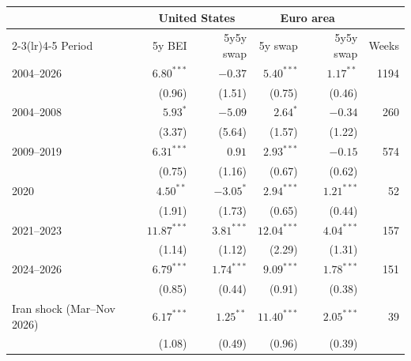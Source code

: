 \begin{tabular}{lrrrrr}
\toprule
 & \multicolumn{2}{c}{United States} & \multicolumn{2}{c}{Euro area} & \\ \cmidrule(lr){2-3}\cmidrule(lr){4-5}
Period & 5y BEI & 5y5y swap & 5y swap & 5y5y swap & Weeks\\
\midrule
2004--2026 & $6.80^{***}$ & $-0.37$ & $5.40^{***}$ & $1.17^{**}$ & 1194\\
 & {\footnotesize (0.96)} & {\footnotesize (1.51)} & {\footnotesize (0.75)} & {\footnotesize (0.46)} & \\
\midrule
2004--2008 & $5.93^{*}$ & $-5.09$ & $2.64^{*}$ & $-0.34$ & 260\\
 & {\footnotesize (3.37)} & {\footnotesize (5.64)} & {\footnotesize (1.57)} & {\footnotesize (1.22)} & \\
2009--2019 & $6.31^{***}$ & $0.91$ & $2.93^{***}$ & $-0.15$ & 574\\
 & {\footnotesize (0.75)} & {\footnotesize (1.16)} & {\footnotesize (0.67)} & {\footnotesize (0.62)} & \\
2020 & $4.50^{**}$ & $-3.05^{*}$ & $2.94^{***}$ & $1.21^{***}$ & 52\\
 & {\footnotesize (1.91)} & {\footnotesize (1.73)} & {\footnotesize (0.65)} & {\footnotesize (0.44)} & \\
2021--2023 & $11.87^{***}$ & $3.81^{***}$ & $12.04^{***}$ & $4.04^{***}$ & 157\\
 & {\footnotesize (1.14)} & {\footnotesize (1.12)} & {\footnotesize (2.29)} & {\footnotesize (1.31)} & \\
2024--2026 & $6.79^{***}$ & $1.74^{***}$ & $9.09^{***}$ & $1.78^{***}$ & 151\\
 & {\footnotesize (0.85)} & {\footnotesize (0.44)} & {\footnotesize (0.91)} & {\footnotesize (0.38)} & \\
Iran shock (Mar--Nov 2026) & $6.17^{***}$ & $1.25^{**}$ & $11.40^{***}$ & $2.05^{***}$ & 39\\
 & {\footnotesize (1.08)} & {\footnotesize (0.49)} & {\footnotesize (0.96)} & {\footnotesize (0.39)} & \\
\bottomrule
\end{tabular}